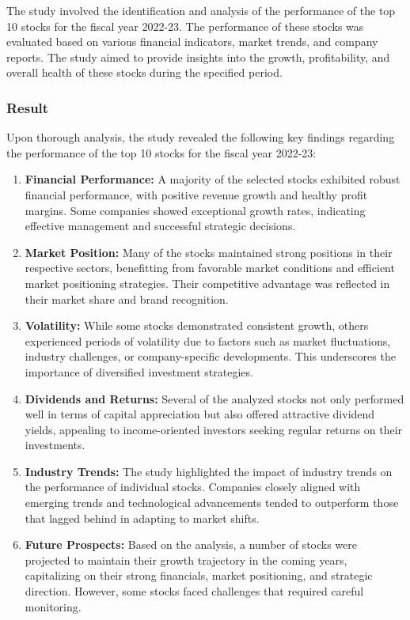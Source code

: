 The study involved the identification and analysis of the performance of the top 10 stocks for the fiscal year 2022-23. The performance of these stocks was evaluated based on various financial indicators, market trends, and company reports. The study aimed to provide insights into the growth, profitability, and overall health of these stocks during the specified period.

\subsubsection{Result}

Upon thorough analysis, the study revealed the following key findings regarding the performance of the top 10 stocks for the fiscal year 2022-23:

\begin{enumerate}
    \item \textbf{Financial Performance:} A majority of the selected stocks exhibited robust financial performance, with positive revenue growth and healthy profit margins. Some companies showed exceptional growth rates, indicating effective management and successful strategic decisions.
    
    \item \textbf{Market Position:} Many of the stocks maintained strong positions in their respective sectors, benefitting from favorable market conditions and efficient market positioning strategies. Their competitive advantage was reflected in their market share and brand recognition.
    
    \item \textbf{Volatility:} While some stocks demonstrated consistent growth, others experienced periods of volatility due to factors such as market fluctuations, industry challenges, or company-specific developments. This underscores the importance of diversified investment strategies.
    
    \item \textbf{Dividends and Returns:} Several of the analyzed stocks not only performed well in terms of capital appreciation but also offered attractive dividend yields, appealing to income-oriented investors seeking regular returns on their investments.
    
    \item \textbf{Industry Trends:} The study highlighted the impact of industry trends on the performance of individual stocks. Companies closely aligned with emerging trends and technological advancements tended to outperform those that lagged behind in adapting to market shifts.
    
    \item \textbf{Future Prospects:} Based on the analysis, a number of stocks were projected to maintain their growth trajectory in the coming years, capitalizing on their strong financials, market positioning, and strategic direction. However, some stocks faced challenges that required careful monitoring.
\end{enumerate}
